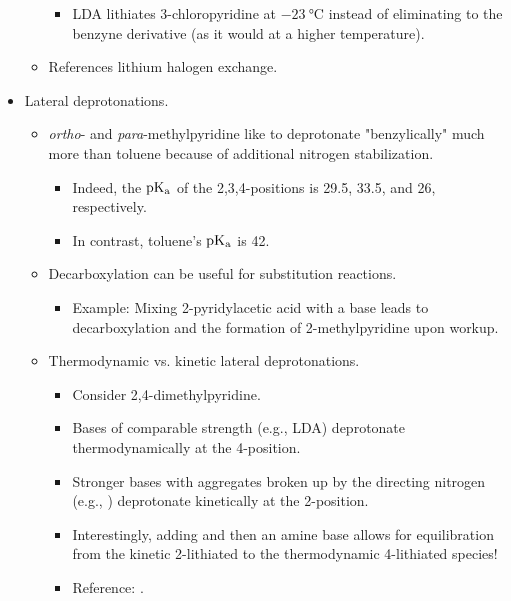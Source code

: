 \documentclass[../notes.tex]{subfiles}
\begin{document}
\begin{itemize}
\begin{itemize}
        \begin{itemize}
            \item LDA lithiates 3-chloropyridine at $-\SI{23}{\celsius}$ instead of eliminating to the benzyne derivative (as it would at a higher temperature).
        \end{itemize}
        \item References lithium halogen exchange.
    \end{itemize}
    \item Lateral deprotonations.
    \begin{itemize}
        \item \emph{ortho}- and \emph{para}-methylpyridine like to deprotonate "benzylically" much more than toluene because of additional nitrogen stabilization.
        \begin{itemize}
            \item Indeed, the $\operatorname{\text{p}K_\text{a}}$ of the 2,3,4-positions is 29.5, 33.5, and 26, respectively.
            \item In contrast, toluene's $\operatorname{\text{p}K_\text{a}}$ is 42.
        \end{itemize}
        \item Decarboxylation can be useful for substitution reactions.
        \begin{itemize}
            \item Example: Mixing 2-pyridylacetic acid with a base leads to decarboxylation and the formation of 2-methylpyridine upon workup.
        \end{itemize}
        \item Thermodynamic vs. kinetic lateral deprotonations.
        \begin{itemize}
            \item Consider 2,4-dimethylpyridine.
            \item Bases of comparable strength (e.g., LDA) deprotonate thermodynamically at the 4-position.
            \item Stronger bases with aggregates broken up by the directing nitrogen (e.g., ) deprotonate kinetically at the 2-position.
            \item Interestingly, adding  and then an amine base allows for equilibration from the kinetic 2-lithiated to the thermodynamic 4-lithiated species!
            \item Reference: \textcite[90]{bib:PyLatThermKin}.
        \end{itemize}
    \end{itemize}

\end{itemize}
\end{document}

